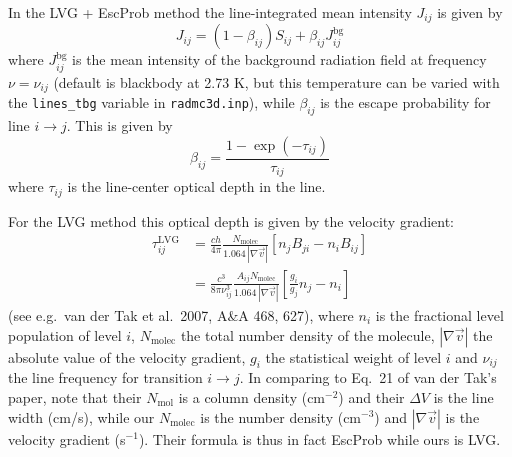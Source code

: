 \documentclass{report}
\begin{document}
In the LVG + EscProb method the line-integrated mean intensity $J_{ij}$ is
given by
\begin{equation}\label{eq-linemeanint-escp}
J_{ij} = (1-\beta_{ij})S_{ij} + \beta_{ij}J_{ij}^{\mathrm{bg}}
\end{equation}
where $J_{ij}^{\mathrm{bg}}$ is the mean intensity of the background
radiation field at frequency $\nu=\nu_{ij}$ (default is blackbody at 2.73 K,
but this temperature can be varied with the {\small\tt lines\_tbg} variable
in {\small\tt radmc3d.inp}), while $\beta_{ij}$ is the escape probability
for line $i\rightarrow j$. This is given by
\begin{equation}\label{eq-escprob-beta-formula}
\beta_{ij} = \frac{1-\exp(-\tau_{ij})}{\tau_{ij}}
\end{equation}
where $\tau_{ij}$ is the line-center optical depth in the line. 

For the LVG method this optical depth is given by the velocity gradient:
\begin{equation}
\begin{split}
\tau_{ij}^{\mathrm{LVG}} & = \frac{ch}{4\pi}\frac{N_{\mathrm{molec}}}
{1.064\,|\nabla \vec v|}\left[n_jB_{ji}-n_iB_{ij}\right]\\
&= \frac{c^3}{8\pi \nu_{ij}^3}\frac{A_{ij}N_{\mathrm{molec}}}
{1.064\,|\nabla \vec v|}\left[\frac{g_i}{g_j}n_j-n_i\right]
\end{split}
\end{equation}
(see e.g.\ van der Tak et al.~2007, A\&A 468, 627), where $n_i$ is the
fractional level population of level $i$, $N_{\mathrm{molec}}$ the total
number density of the molecule, $|\nabla \vec v|$ the absolute value of the
velocity gradient, $g_i$ the statistical weight of level $i$ and $\nu_{ij}$
the line frequency for transition $i\rightarrow j$. In comparing to Eq.~21
of van der Tak's paper, note that their $N_{\mathrm{mol}}$ is a column
density (cm$^{-2}$) and their $\Delta V$ is the line width (cm/s), while our
$N_{\mathrm{molec}}$ is the number density (cm$^{-3}$) and 
$|\nabla \vec v|$ is the velocity gradient (s$^{-1}$). Their formula is
thus in fact EscProb while ours is LVG.
\end{document}
